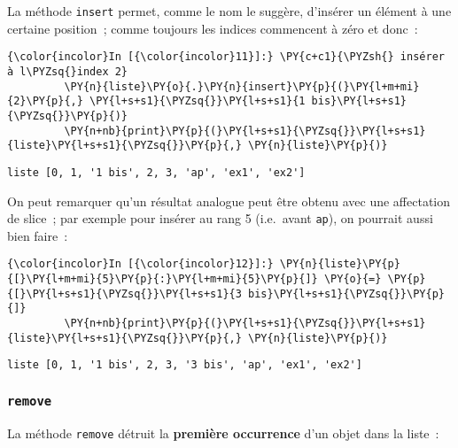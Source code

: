     La méthode \texttt{insert} permet, comme le nom le suggère, d'insérer un
élément à une certaine position~; comme toujours les indices commencent
à zéro et donc~:

    \begin{Verbatim}[commandchars=\\\{\}]
{\color{incolor}In [{\color{incolor}11}]:} \PY{c+c1}{\PYZsh{} insérer à l\PYZsq{}index 2}
         \PY{n}{liste}\PY{o}{.}\PY{n}{insert}\PY{p}{(}\PY{l+m+mi}{2}\PY{p}{,} \PY{l+s+s1}{\PYZsq{}}\PY{l+s+s1}{1 bis}\PY{l+s+s1}{\PYZsq{}}\PY{p}{)}
         \PY{n+nb}{print}\PY{p}{(}\PY{l+s+s1}{\PYZsq{}}\PY{l+s+s1}{liste}\PY{l+s+s1}{\PYZsq{}}\PY{p}{,} \PY{n}{liste}\PY{p}{)}
\end{Verbatim}


    \begin{Verbatim}[commandchars=\\\{\}]
liste [0, 1, '1 bis', 2, 3, 'ap', 'ex1', 'ex2']

    \end{Verbatim}

    On peut remarquer qu'un résultat analogue peut être obtenu avec une
affectation de slice~; par exemple pour insérer au rang 5 (i.e.~avant
\texttt{ap}), on pourrait aussi bien faire~:

    \begin{Verbatim}[commandchars=\\\{\}]
{\color{incolor}In [{\color{incolor}12}]:} \PY{n}{liste}\PY{p}{[}\PY{l+m+mi}{5}\PY{p}{:}\PY{l+m+mi}{5}\PY{p}{]} \PY{o}{=} \PY{p}{[}\PY{l+s+s1}{\PYZsq{}}\PY{l+s+s1}{3 bis}\PY{l+s+s1}{\PYZsq{}}\PY{p}{]}
         \PY{n+nb}{print}\PY{p}{(}\PY{l+s+s1}{\PYZsq{}}\PY{l+s+s1}{liste}\PY{l+s+s1}{\PYZsq{}}\PY{p}{,} \PY{n}{liste}\PY{p}{)}
\end{Verbatim}


    \begin{Verbatim}[commandchars=\\\{\}]
liste [0, 1, '1 bis', 2, 3, '3 bis', 'ap', 'ex1', 'ex2']

    \end{Verbatim}

    \hypertarget{remove}{%
\subsubsection{\texorpdfstring{\texttt{remove}}{remove}}\label{remove}}

    La méthode \texttt{remove} détruit la \textbf{première occurrence} d'un
objet dans la liste~:

